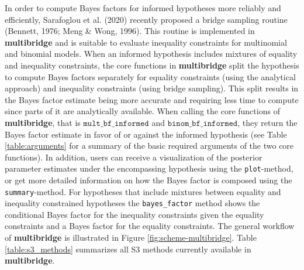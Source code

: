 \documentclass[
  english,
  man,floatsintext]{apa6}
\begin{document}
In order to compute Bayes factors for informed hypotheses more reliably and efficiently, Sarafoglou et al. (2020) recently proposed a bridge sampling routine (Bennett, 1976; Meng \& Wong, 1996). This routine is implemented in \textbf{multibridge} and is suitable to evaluate inequality constraints for multinomial and binomial models. When an informed hypothesis includes mixtures of equality and inequality constraints, the core functions in \textbf{multibridge} split the hypothesis to compute Bayes factors separately for equality constraints (using the analytical approach) and inequality constraints (using bridge sampling). This split results in the Bayes factor estimate being more accurate and requiring less time to compute since parts of it are analytically available. When calling the core functions of \textbf{multibridge}, that is \(\texttt{mult\_bf\_informed}\) and \(\texttt{binom\_bf\_informed}\), they return the Bayes factor estimate in favor of or against the informed hypothesis (see Table \ref{table:arguments} for a summary of the basic required arguments of the two core functions). In addition, users can receive a visualization of the posterior parameter estimates under the encompassing hypothesis using the \texttt{plot}-method, or get more detailed information on how the Bayes factor is composed using the \texttt{summary}-method. For hypotheses that include mixtures between equality and inequality constrained hypotheses the \texttt{bayes\_factor} method shows the conditional Bayes factor for the inequality constraints given the equality constraints and a Bayes factor for the equality constraints. The general workflow of \textbf{multibridge} is illustrated in Figure \ref{fig:scheme-multibridge}. Table \ref{table:s3_methods} summarizes all S3 methods currently available in \textbf{multibridge}.
\end{document}
